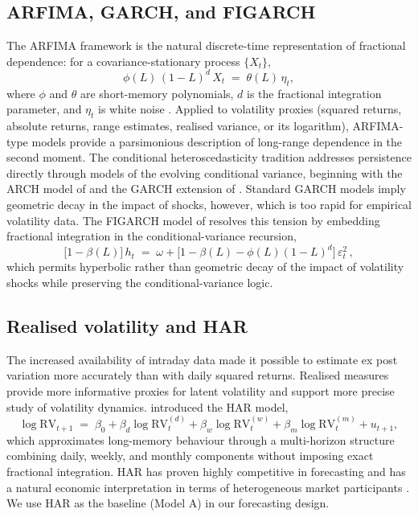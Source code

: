\documentclass[11pt,a4paper]{article}
\begin{document}
\subsection{ARFIMA, GARCH, and FIGARCH}

The ARFIMA framework is the natural discrete-time representation of
fractional dependence: for a covariance-stationary process $\{X_t\}$,
\begin{equation}
  \phi(L)\, (1-L)^d\, X_t \;=\; \theta(L)\,\eta_t,
\end{equation}
where $\phi$ and $\theta$ are short-memory polynomials, $d$ is the
fractional integration parameter, and $\eta_t$ is white noise
\citep{granger1980introduction,hosking1981fractional}. Applied to
volatility proxies (squared returns, absolute returns, range estimates,
realised variance, or its logarithm), ARFIMA-type models provide a
parsimonious description of long-range dependence in the second moment.
The conditional heteroscedasticity tradition addresses persistence
directly through models of the evolving conditional variance, beginning
with the ARCH model of \citet{engle1982autoregressive} and the GARCH
extension of \citet{bollerslev1986generalized}. Standard GARCH models
imply geometric decay in the impact of shocks, however, which is too
rapid for empirical volatility data. The FIGARCH model of
\citet{baillie1996fractionally} resolves this tension by embedding
fractional integration in the conditional-variance recursion,
\begin{equation}
  \bigl[1 - \beta(L)\bigr]\, h_t \;=\; \omega
  + \bigl[1 - \beta(L) - \phi(L)(1-L)^d\bigr]\, \varepsilon_t^2 \,,
\end{equation}
which permits hyperbolic rather than geometric decay of the impact of
volatility shocks while preserving the conditional-variance logic.

\subsection{Realised volatility and HAR}

The increased availability of intraday data made it possible to estimate
ex post variation more accurately than with daily squared returns.
Realised measures \citep{andersen2003modeling,barndorff2002econometric}
provide more informative proxies for latent volatility and support more
precise study of volatility dynamics. \citet{corsi2009simple} introduced
the HAR model,
\begin{equation}
  \log \mathrm{RV}_{t+1} \;=\; \beta_0 + \beta_d \log \mathrm{RV}^{(d)}_t
  + \beta_w \log \mathrm{RV}^{(w)}_t
  + \beta_m \log \mathrm{RV}^{(m)}_t
  + u_{t+1},
\end{equation}
which approximates long-memory behaviour through a multi-horizon structure
combining daily, weekly, and monthly components without imposing exact
fractional integration. HAR has proven highly competitive in forecasting
and has a natural economic interpretation in terms of heterogeneous
market participants \citep{muller1997volatilities}. We use HAR as the
baseline (Model A) in our forecasting design.
\end{document}
